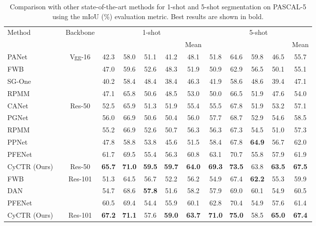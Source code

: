 \documentclass{article}
\begin{document}
\begin{table}[t]
\caption{Comparison with other state-of-the-art methods for 1-shot and 5-shot segmentation on PASCAL-5 using the mIoU (\%) evaluation metric. Best results are shown in bold.}
\label{tab:pascal}
\small
\centering
\tabcolsep 0.08in\begin{tabular}{l|c|ccccc|ccccc}
\toprule[1pt]
\multirow{2}{*}{Method} & \multirow{2}{*}{Backbone} & \multicolumn{5}{c|}{1-shot} & \multicolumn{5}{c}{5-shot} \\ \cline{3-12} 
	&  &  &  &  &  & Mean &  &  &  &  & Mean \\
\hline
PANet~\cite{wang2019panet} \ & \multirow{4}{*}{Vgg-16}  &42.3 & 58.0 & 51.1 & 41.2 & 48.1 & 51.8 & 64.6 & 59.8 & 46.5 & 55.7  \\
FWB~\cite{nguyen2019FWB} \ & &47.0 & 59.6 & 52.6 & 48.3 & 51.9 & 50.9 & 62.9 & 56.5 & 50.1 & 55.1  \\
SG-One~\cite{zhang2020sgone} \ & & 40.2 & 58.4 & 48.4 & 38.4 & 46.3 & 41.9 & 58.6 & 48.6 & 39.4 & 47.1\\
RPMM~\cite{yang2020PMM} \ & & 47.1 & 65.8 & 50.6 & 48.5 & 53.0 & 50.0&  66.5 & 51.9 & 47.6 & 54.0 \\
\hline
CANet~\cite{zhang2019canet} \ & \multirow{5}{*}{Res-50} & 52.5 & 65.9 & 51.3 & 51.9 &  55.4 & 55.5 & 67.8 & 51.9 & 53.2  & 57.1 \\
PGNet~\cite{zhang2019pgnet} \  &  &  56.0 & 66.9 & 50.6 & 50.4 &  56.0 & 57.7 & 68.7 & 52.9 & 54.6  & 58.5 \\
RPMM~\cite{yang2020PMM} \ & &55.2 & 66.9 & 52.6 & 50.7 & 56.3 & 56.3 & 67.3 &  54.5 & 51.0 & 57.3  \\
PPNet~\cite{liu2020ppnet} \* & &47.8 & 58.8 & 53.8 & 45.6 & 51.5 & 58.4 & 67.8 &  \textbf{64.9} & 56.7 &  62.0  \\
PFENet~\cite{tian2020pfenet} \ & & 61.7 & 69.5 & 55.4 & 56.3 & 60.8 & 63.1 & 70.7 & 55.8 & 57.9 & 61.9 \\

\hline
CyCTR (Ours) \ & Res-50 & \textbf{65.7} & \textbf{71.0} & \textbf{59.5} & \textbf{59.7} & \textbf{64.0} & \textbf{69.3} & \textbf{73.5} & 63.8 & \textbf{63.5} & \textbf{67.5} \\
\hline
FWB~\cite{nguyen2019FWB} \ & \multirow{3}{*}{Res-101} &51.3 & 64.5 & 56.7 & 52.2 & 56.2 & 54.9 & 67.4 &  \textbf{62.2} & 55.3 & 59.9  \\
DAN~\cite{cao2020dan} \ &  & 54.7 &  68.6 & \textbf{57.8} & 51.6 & 58.2 & 57.9 &  69.0 & 60.1 & 54.9 & 60.5  \\
PFENet~\cite{tian2020pfenet} \  &  & 60.5 & 69.4 & 54.4 & 55.9 & 60.1 & 62.8 & 70.4 & 54.9 & 57.6 & 61.4 \\
\hline
CyCTR (Ours) \ & Res-101 & \textbf{67.2} & \textbf{71.1} & 57.6 & \textbf{59.0} & \textbf{63.7} & \textbf{71.0} & \textbf{75.0} & 58.5 & \textbf{65.0} & \textbf{67.4} \\

\bottomrule[1pt]
\end{tabular}
\end{table}
\end{document}
